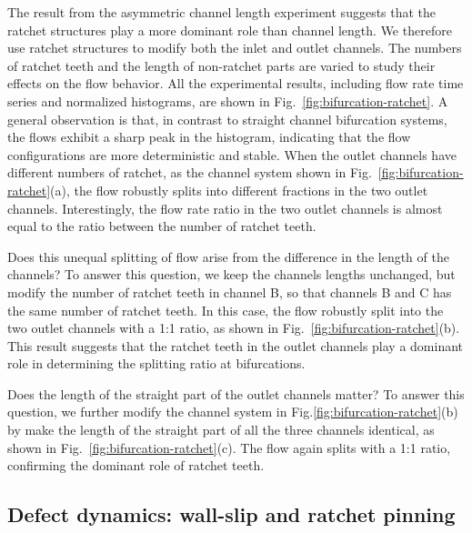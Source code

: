 \documentclass[%
10pt,
superscriptaddress,
twocolumn,
 amsmath,amssymb,
 aps,prx,
]{revtex4-2}
\begin{document}
The result from the asymmetric channel length experiment suggests that the ratchet structures play a more dominant role than channel length.
We therefore use ratchet structures to modify both the inlet and outlet channels.
The numbers of ratchet teeth and the length of non-ratchet parts are varied to study their effects on the flow behavior. 
All the experimental results, including flow rate time series and normalized histograms, are shown in Fig.~\ref{fig:bifurcation-ratchet}.
A general observation is that, in contrast to straight channel bifurcation systems, the flows exhibit a sharp peak in the histogram, indicating that the flow configurations are more deterministic and stable.
When the outlet channels have different numbers of ratchet, as the channel system shown in Fig.~\ref{fig:bifurcation-ratchet}(a), the flow robustly splits into different fractions in the two outlet channels.
Interestingly, the flow rate ratio in the two outlet channels is almost equal to the ratio between the number of ratchet teeth.

Does this unequal splitting of flow arise from the difference in the length of the channels?
To answer this question, we keep the channels lengths unchanged, but modify the number of ratchet teeth in channel B, so that channels B and C has the same number of ratchet teeth.
In this case, the flow robustly split into the two outlet channels with a 1:1 ratio, as shown in Fig.~\ref{fig:bifurcation-ratchet}(b).
This result suggests that the ratchet teeth in the outlet channels play a dominant role in determining the splitting ratio at bifurcations.

Does the length of the straight part of the outlet channels matter?
To answer this question, we further modify the channel system in Fig.\ref{fig:bifurcation-ratchet}(b) by make the length of the straight part of all the three channels identical, as shown in Fig.~\ref{fig:bifurcation-ratchet}(c).
The flow again splits with a 1:1 ratio, confirming the dominant role of ratchet teeth.


\subsection{Defect dynamics: wall-slip and ratchet pinning}
\end{document}
